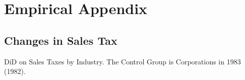 \documentclass[
  12pt]{article}
\theoremstyle{definition}
\theoremstyle{remark}
\begin{document}
\section{Empirical Appendix}\label{empirical-appendix}

\subsection{Changes in Sales Tax}\label{changes-in-sales-tax}

\begin{table}

\caption{\label{tbl-reg-did-inds}DiD on Sales Taxes by Industry. The
Control Group is Corporations in 1983 (1982).}

\begin{minipage}{\linewidth}


\end{minipage}
\end{table}
\end{document}
